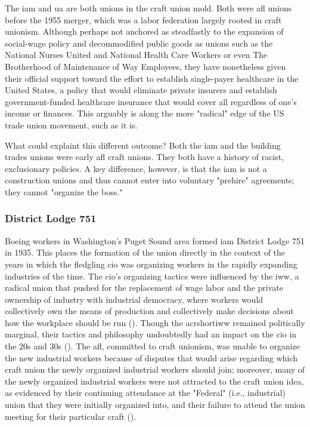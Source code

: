 \documentclass[12pt]{article}
\begin{document}
The \acrfull{iam} and \acrshort{ua} are both unions in the craft union mold. Both were \acrfull{afl} unions before the 1955 merger, which was a labor federation largely rooted in craft unionism. Although perhaps not anchored as steadfastly to the expansion of social-wage policy and decommodified public goods as unions such as the National Nurses United and National Health Care Workers or even The Brotherhood of Maintenance of Way Employees, they have nonetheless given their official support toward the effort to establish single-payer healthcare in the United States, a policy that would eliminate private insurers and establish government-funded healthcare insurance that would cover all regardless of one's income or finances. This arguably is along the more "radical" edge of the US trade union movement, such as it is.

What could explaint this different outcome? Both the \acrshort{iam} and the building trades unions were early \acrshort{afl} craft unions. They both have a history of racist, exclusionary policies. A key difference, however, is that the \acrshort{iam} is not a construction unions and thus cannot enter into voluntary "prehire" agreements; they cannot "organize the boss."

\subsubsection{District Lodge 751}
Boeing workers in Washington's Puget Sound area formed \acrshort{iam} District Lodge 751 in 1935. This places the formation of the union directly in the context of the years in which the fledgling \acrshort{cio} was organizing workers in the rapidly expanding industries of the time. The \acrshort{cio}'s organizing tactics were influenced by the \acrfull{iww}, a radical union that pushed for the replacement of wage labor and the private ownership of industry with industrial democracy, where workers would collectively own the means of production and collectively make decisions about how the workplace should be run (\cite{industrialworkersoftheworldIWW}). Though the acrshort{iww} remained politically marginal, their tactics and philosophy undoubtedly had an impact on the \acrshort{cio} in the 20s and 30s (\cite[2-6]{mccannBloodWaterHistory1989}). The \acrshort{afl}, committed to craft unionism, was unable to organize the new industrial workers because of disputes that would arise regarding which craft union the newly organized industrial workers should join; moreover, many of the newly organized industrial workers were not attracted to the craft union idea, as evidenced by their continuing attendance at the "Federal" (i.e., industrial) union that they were initially organized into, and their failure to attend the union meeting for their particular craft (\cite[8]{mccannBloodWaterHistory1989}). 
\end{document}
